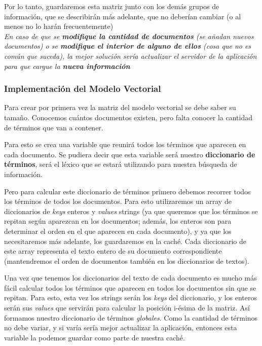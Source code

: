 \documentclass[12pt]{article}
\newcommand{\keys}{\textit{keys} }
\newcommand{\values}{\textit{values} }
\begin{document}
	Por lo tanto, guardaremos esta matriz junto con los demás grupos de información, que se describirán más adelante, que no deberían cambiar (o al menos no lo harán frecuentemente) \\
	
	\emph{En caso de que se \textbf{modifique la cantidad de documentos} (se añadan nuevos documentos) o se \textbf{modifique el interior de alguno de ellos} (cosa que no es común que suceda), la mejor solución sería actualizar el servidor de la aplicación para que cargue la \textbf{nueva información} } \\
	
\subsubsection*{Implementación del Modelo Vectorial}
	Para crear por primera vez la matriz del modelo vectorial se debe saber su tamaño.
	Conocemos cuántos documentos existen, pero falta conocer la cantidad de términos que van a contener.
	
	Para esto se crea una variable que reunirá todos los términos que aparecen en cada documento.
	Se pudiera decir que esta variable será nuestro \textbf{diccionario de términos}, será el léxico que se estará utilizando para nuestra búsqueda de información.
	
	Pero para calcular este diccionario de términos primero debemos recorrer todos los términos de todos los documentos.
	Para esto utilizaremos un array de diccionarios de \keys enteros y \values strings (ya que queremos que los términos se repitan según aparezcan en los documentos; además, los enteros son para determinar el orden en el que aparecen en cada documento), y ya que los necesitaremos más adelante, los guardaremos en la caché.
	Cada diccionario de este array representa el texto entero de su documento correspondiente (mantendremos el orden de documentos también en los diccionarios de textos).
	
	Una vez que tenemos los diccionarios del texto de cada documento es mucho más fácil calcular todos los términos que aparecen en todos los documentos sin que se repitan.
	Para esto, esta vez los strings serán los \textit{keys} del diccionario, y los enteros serán sus \textit{values} que servirán para calcular la posición i-ésima de la matriz.
	Así formamos nuestro diccionario de términos \textit{globales}.	
	Como la cantidad de términos no debe variar, y si varía sería mejor actualizar la aplicación, entonces esta variable la podemos guardar como parte de nuestra caché.
	
\end{document}

